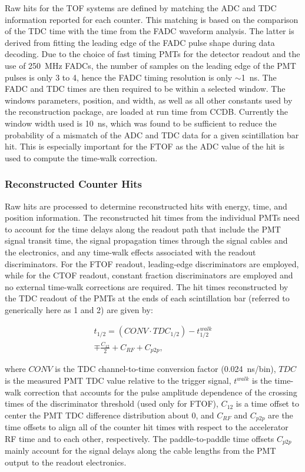 Raw hits for the TOF systems are defined by matching the ADC and TDC information reported for each counter. This
matching is based on the comparison of the TDC time with the time from the FADC waveform analysis. The latter is
derived from fitting the leading edge of the FADC pulse shape during data decoding. Due to the choice of fast timing
PMTs for the detector readout and the use of 250~MHz FADCs, the number of samples on the leading edge of the
PMT pulses is only 3 to 4, hence the FADC timing resolution is only $\sim$1~ns. The FADC and TDC times are then
required to be within a selected window. The windows parameters, position, and width, as well as all other constants
used by the reconstruction package, are loaded at run time from CCDB. Currently the window width used is 10~ns,
which was found to be sufficient to reduce the probability of a mismatch of the ADC and TDC data for a given
scintillation bar hit. This is especially important for the FTOF as the ADC value of the hit is used to compute the
time-walk correction.

\subsubsection{Reconstructed Counter Hits}
\label{rec:hits}

Raw hits are processed to determine reconstructed hits with energy, time, and position information.  The
reconstructed hit times from the individual PMTs need to account for the time delays along the readout path
that include the PMT signal transit time, the signal propagation times through the signal cables and the electronics,
and any time-walk effects associated with the readout discriminators. For the FTOF readout, leading-edge
discriminators are employed, while for the CTOF readout, constant fraction discriminators are employed and no
external time-walk corrections are required. The hit times reconstructed by the TDC readout of the PMTs at the
ends of each scintillation bar (referred to generically here as 1 and 2) are given by:

\begin{multline}
t_{1/2} = (CONV \cdot TDC_{1/2}) - t_{1/2}^{walk} \\ \mp \frac{C_{12}}{2} + C_{RF} + C_{p2p},
\end{multline}

\noindent
where $CONV$ is the TDC channel-to-time conversion factor (0.024~ns/bin), $TDC$ is the measured PMT TDC
value relative to the trigger signal, $t^{walk}$ is the time-walk correction that accounts for the pulse amplitude
dependence of the crossing times of the discriminator threshold (used only for FTOF), $C_{12}$ is a time offset
to center the PMT TDC difference distribution about 0, and $C_{RF}$ and $C_{p2p}$ are the time offsets to
align all of the counter hit times with respect to the accelerator RF time and to each other, respectively. The
paddle-to-paddle time offsets $C_{p2p}$ mainly account for the signal delays along the cable lengths from the PMT
output to the readout electronics.

